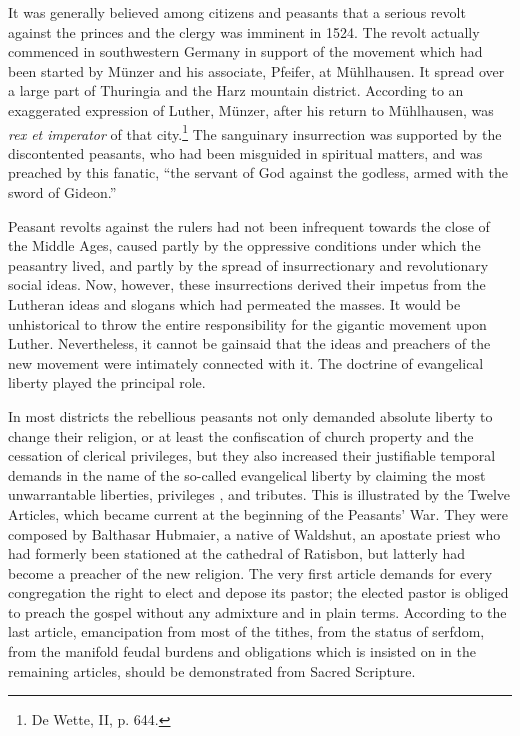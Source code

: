 It was generally believed among citizens and peasants that a serious
revolt against the princes and the clergy was imminent in 1524.
The revolt actually commenced in southwestern Germany in support of the
movement which had been started by Münzer and his
associate, Pfeifer, at Mühlhausen. It spread over a large part of
Thuringia and the Harz mountain district. According to an exaggerated
expression of Luther, Münzer, after his return to Mühlhausen,
was \textit{rex et imperator} of that city.\footnote{De Wette, II, p. 644.}
The sanguinary insurrection
was supported by the discontented peasants, who had been misguided
in spiritual matters, and was preached by this fanatic, “the servant of
God against the godless, armed with the sword of Gideon.”

Peasant revolts against the rulers had not been infrequent towards
the close of the Middle Ages, caused partly by the oppressive conditions
under which the peasantry lived, and partly by the spread
of insurrectionary and revolutionary social ideas. Now, however,
these insurrections derived their impetus from the Lutheran ideas
and slogans which had permeated the masses. It would be unhistorical
to throw the entire responsibility for the gigantic movement upon
Luther. Nevertheless, it cannot be gainsaid that the ideas and preachers
of the new movement were intimately connected with it. The
doctrine of evangelical liberty played the principal role.

In most districts the rebellious peasants not only demanded absolute
liberty to change their religion, or at least the confiscation of
church property and the cessation of clerical privileges, but they also
increased their justifiable temporal demands in the name of the so-called
evangelical liberty by claiming the most unwarrantable liberties, privileges
, and tributes. This is illustrated by the Twelve
Articles, which became current at the beginning of the Peasants’
War. They were composed by Balthasar Hubmaier, a native of Waldshut, an
apostate priest who had formerly been stationed at the cathedral of Ratisbon,
but latterly had become a preacher of the new
religion. The very first article demands for every congregation the
right to elect and depose its pastor; the elected pastor is obliged to
preach the gospel without any admixture and in plain terms. According
to the last article, emancipation from most of the tithes,
from the status of serfdom, from the manifold feudal burdens and
obligations which is insisted on in the remaining articles, should be
demonstrated from Sacred Scripture.

